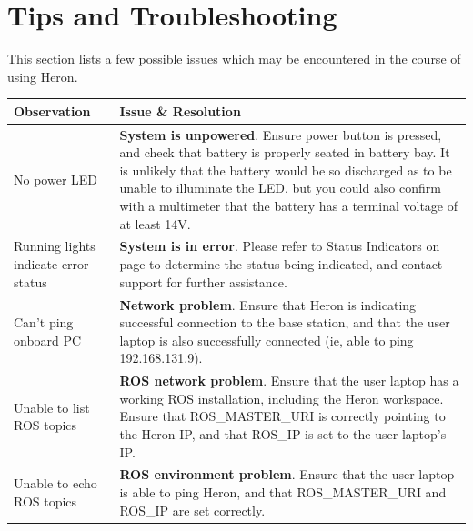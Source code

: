 \documentclass[]{clearpath-latex/clearpath-manual}
\begin{document}
\newpage

\section{Tips and Troubleshooting}
This section lists a few possible issues which may be encountered in the course of using Heron.

\bgroup
\def\arraystretch{1.5}%
\begin{table}[h]
\centering
\label{troublshooting}
\begin{tabular}{p{} p{}}

\rowcolor{lightgrey} 
{\bf Observation}                    & {\bf Issue \& Resolution}                                                                                                                                                                                                                                                                                          \\ \hline
No power LED                         & \textbf{System is unpowered}. Ensure power button is pressed, and check that battery is properly seated in battery bay. It is unlikely that the battery would be so discharged as to be unable to illuminate the LED, but you could also confirm with a multimeter that the battery has a terminal voltage of at least 14V. \\ \hline
Running lights indicate error status & \textbf{System is in error}. Please refer to Status Indicators on page \pageref{statusindicators} to determine the status being indicated, and contact support for further assistance.                                                                                                                                                               \\ \hline
Can’t ping onboard PC                & \textbf{Network problem}. Ensure that Heron is indicating successful connection to the base station, and that the user laptop is also successfully connected (ie, able to ping 192.168.131.9).                                                                                                                           \\ \hline
Unable to list ROS topics            & \textbf{ROS network problem}. Ensure that the user laptop has a working ROS installation, including the Heron workspace. Ensure that ROS\_MASTER\_URI is correctly pointing to the Heron IP, and that ROS\_IP is set to the user laptop’s IP.                                                                     \\ \hline
Unable to echo ROS topics            & \textbf{ROS environment problem}. Ensure that the user laptop is able to ping Heron, and that ROS\_MASTER\_URI and ROS\_IP are set correctly.                                                                                                                                                                          \\ \hline
\end{tabular}
\end{table}
\egroup
\end{document}
